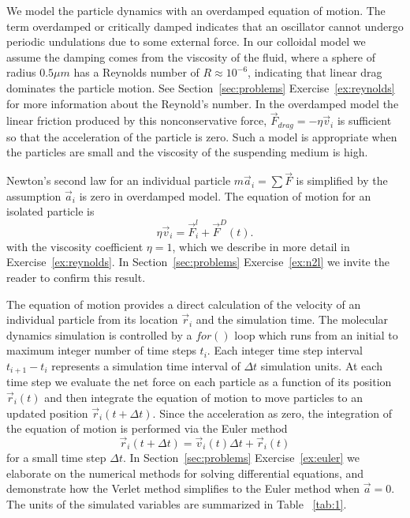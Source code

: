 \documentclass[twocolumn,preprintnumbers,amsmath,amssymb,aps,prx]{revtex4}
\begin{document}
We model the 
particle dynamics 
with an overdamped
equation of motion.
The term overdamped or critically damped indicates
that an oscillator cannot undergo periodic
undulations due to some external force. %
In our colloidal model we assume
the damping comes from the viscosity of the fluid,
where a sphere of radius $0.5 \mu m$ has a Reynolds number
of $R \approx 10^{-6}$, indicating that linear drag dominates
the particle motion.
See Section~\ref{sec:problems} Exercise~\ref{ex:reynolds} for more information
about the Reynold's number.
In the overdamped model the
linear friction produced by this 
nonconservative force,
$\vec{F}_{drag} = -\eta \vec{v}_i$ is 
sufficient so that
the acceleration of the particle is zero.
Such a model is appropriate when the particles
are small and the viscosity of the suspending medium is high.


Newton's second law for an individual particle
$m \vec{a}_i = \sum \vec{F}$ is simplified
by the assumption $\vec{a}_i$ is zero in overdamped model.
The equation of motion for an isolated particle is
\begin{equation}
  \eta \vec{v}_i = \vec{F}^l_{i} + \vec{F}^{D}(t).
    \label{eq:motion}
\end{equation}
with the viscosity coefficient $\eta = 1$,
which we describe in more detail in Exercise~\ref{ex:reynolds}.
In Section~\ref{sec:problems} Exercise~\ref{ex:n2l}
we invite the reader to confirm this result.

The equation of motion provides a direct calculation of the velocity
of an individual particle from its location $\vec{r}_i$ %
and the simulation time.
The molecular dynamics simulation is controlled by a $for()$ loop
 which runs from an initial to maximum integer number of time steps $t_i$.
Each integer time step interval $t_{i+1}-t_i$
represents a simulation time interval of $\Delta t$ 
simulation units.  %
At each time step
we evaluate the net force on each particle as a function of its position
$\vec{r}_i(t)$
and then integrate
the equation of motion to move particles
to an updated position
$\vec{r}_i(t+\Delta t)$.
%
Since the acceleration as zero,
the integration of the equation of motion
is performed via 
the Euler method 
\begin{equation}
  \vec{r}_i(t+\Delta t) = \vec{v}_i(t) \Delta t + \vec{r}_i(t)
    \label{eq:euler}
\end{equation}
for a small time step $\Delta t$.
In Section~\ref{sec:problems} Exercise~\ref{ex:euler}
we elaborate on
the numerical methods for 
solving differential equations,
and demonstrate how the Verlet method
simplifies to the Euler method when $\vec{a}=0$.
%
The units of the simulated variables are summarized in Table ~\ref{tab:1}.
\end{document}
